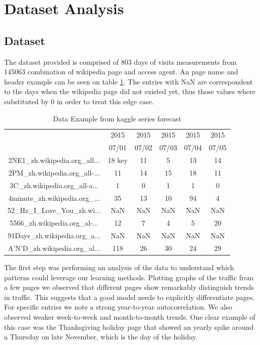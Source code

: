 \section{Dataset Analysis}

\subsection{Dataset}
The dataset provided is comprised of 803 days of visits measurements from 145063 combination of wikipedia page and access agent. An page name and header example can be seen on table \ref{tab:wiki_data}. The entries with NaN are correspondent to the days when the wikipedia page did not existed yet, thus those values where substituted by 0 in order to treat this edge case.

\begin{table}[htbp]
\centering
	\begin{tabular}{|c|c|c|c|c|c|}\hline
		&2015&2015&2015&2015&2015\\
		&07/01&07/02&07/03&07/04&07/05\\\hline
		2NE1\_zh.wikipedia.org\_all...& 18  key& 11  & 5   & 13  & 14 \\\hline
		2PM\_zh.wikipedia.org\_all-...& 11  & 14  & 15  & 18  & 11 \\\hline
		3C\_zh.wikipedia.org\_all-a...& 1   & 0   & 1   & 1   & 0 \\ \hline
		4minute\_zh.wikipedia.org\_...& 35  & 13  & 10  & 94  & 4 \\\hline
		52\_Hz\_I\_Love\_You\_zh.wi...& NaN & NaN & NaN & NaN & NaN \\\hline
		5566\_zh.wikipedia.org\_al-...& 12 & 7 & 4 & 5 & 20 \\\hline
		91Days\_zh.wikipedia.org\_a...&NaN&NaN&NaN&NaN&NaN \\\hline
		A'N'D\_zh.wikipedia.org\_al...& 118 & 26 & 30 & 24 & 29\\\hline
	\end{tabular}
	\vspace{1mm}
		\caption{Data Example from kaggle series forecast\label{tab:wiki_data}}
\end{table}


The first step was performing an analysis of the data to understand which patterns could leverage our learning methods. Plotting graphs of the traffic from a few pages we observed that different pages show remarkably distinguish trends in traffic. This suggests that a good model needs to explicitly differentiate pages.
For specific entries we note a strong year-to-year autocorrelation. We also observed weaker week-to-week and month-to-month trends. One clear example of this case was the Thanksgiving holiday page that showed an yearly spike around a Thursday on late November, which is the day of the holiday.

